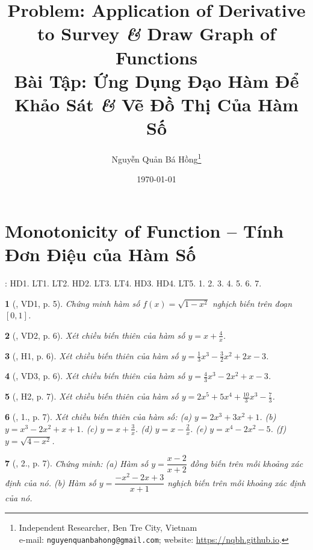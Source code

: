 \documentclass{article}
\title{Problem: Application of Derivative to Survey {\it\&} Draw Graph of Functions\\Bài Tập: Ứng Dụng Đạo Hàm Để Khảo Sát {\it\&} Vẽ Đồ Thị Của Hàm Số}
\author{Nguyễn Quản Bá Hồng\footnote{Independent Researcher, Ben Tre City, Vietnam\\e-mail: \texttt{nguyenquanbahong@gmail.com}; website: \url{https://nqbh.github.io}.}}
\date{\today}
\newtheorem{baitoan}{}
\begin{document}
\maketitle
\tableofcontents


\section{Monotonicity of Function -- Tính Đơn Điệu của Hàm Số}
\cite[Chap. I, \S1, pp. 5--14]{SGK_Toan_12_Canh_Dieu_tap_1}: HD1. LT1. LT2. HD2. LT3. LT4. HD3. HD4. LT5. 1. 2. 3. 4. 5. 6. 7.

\begin{baitoan}[\cite{SGK_Toan_12_giai_tich_nang_cao}, VD1, p. 5]
	Chứng minh hàm số $f(x) = \sqrt{1 - x^2}$ nghịch biến trên đoạn $[0,1]$.
\end{baitoan}

\begin{baitoan}[\cite{SGK_Toan_12_giai_tich_nang_cao}, VD2, p. 6]
	Xét chiều biến thiên của hàm số $y = x + \frac{4}{x}$.
\end{baitoan}

\begin{baitoan}[\cite{SGK_Toan_12_giai_tich_nang_cao}, H1, p. 6]
	Xét chiều biến thiên của hàm số $y = \frac{1}{3}x^3 - \frac{3}{2}x^2 + 2x - 3$.
\end{baitoan}

\begin{baitoan}[\cite{SGK_Toan_12_giai_tich_nang_cao}, VD3, p. 6]
	Xét chiều biến thiên của hàm số $y = \frac{4}{3}x^3 - 2x^2 + x - 3$.
\end{baitoan}

\begin{baitoan}[\cite{SGK_Toan_12_giai_tich_nang_cao}, H2, p. 7]
	Xét chiều biến thiên của hàm số $y = 2x^5 + 5x^4 + \frac{10}{3}x^3 - \frac{7}{3}$.
\end{baitoan}

\begin{baitoan}[\cite{SGK_Toan_12_giai_tich_nang_cao}, 1., p. 7]
	Xét chiều biến thiên của hàm số: (a) $y = 2x^3 + 3x^2 + 1$. (b) $y = x^3 - 2x^2 + x + 1$. (c) $y = x + \frac{3}{x}$. (d) $y = x - \frac{2}{x}$. (e) $y = x^4 - 2x^2 - 5$. (f) $y = \sqrt{4 - x^2}$.
\end{baitoan}

\begin{baitoan}[\cite{SGK_Toan_12_giai_tich_nang_cao}, 2., p. 7]
	Chứng minh: (a) Hàm số $y = \dfrac{x - 2}{x + 2}$ đồng biến trên mỗi khoảng xác định của nó. (b) Hàm số $y = \dfrac{-x^2 - 2x + 3}{x + 1}$ nghịch biến trên mỗi khoảng xác định của nó.
\end{baitoan}
\end{document}
